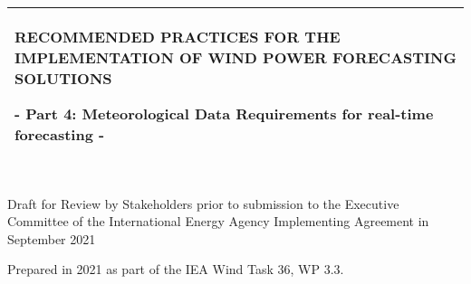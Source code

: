 %
%
%
%
%
\begin{titlepage}
  \addtolength{\hoffset}{0.5\evensidemargin-0.5\oddsidemargin} %
  \noindent%
  \begin{tabular}{@{}p{\textwidth}@{}}
    \toprule[2pt]
    \midrule
    \vspace{0.2cm}
    \begin{center}
    \Huge{\textbf{
RECOMMENDED PRACTICES FOR THE IMPLEMENTATION OF
 WIND POWER FORECASTING SOLUTIONS%
    }}
    \end{center}
    \begin{center}
      \Large{
        - Part 4:  Meteorological Data Requirements for real-time forecasting -%
      }
    \end{center}
    \vspace{0.2cm}\\
    \midrule
    \toprule[2pt]
  \end{tabular}
  \vspace{4 cm}
  \begin{center}
    {\large
      \color{blue}{1. DRAFT EDITION 2021} \\ 
    }
    \vspace{0.2cm}
    {\Large
      Draft for Review by Stakeholders prior to submission to the Executive Committee of the International Energy Agency Implementing Agreement in September 2021%
    }
  \end{center}
  \vfill
  \begin{center}
  Prepared in 2021 as part of the IEA Wind Task 36, WP 3.3.
  \end{center}
\end{titlepage}
\clearpage
